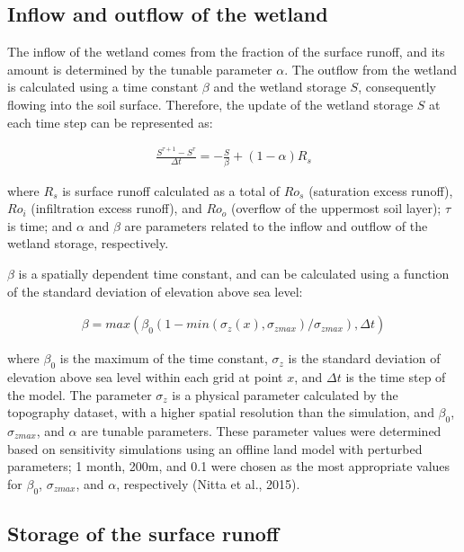 \hypertarget{inflow-and-outflow-of-the-wetland}{%
\subsection{Inflow and outflow of the wetland}\label{inflow-and-outflow-of-the-wetland}}

The inflow of the wetland comes from the fraction of the surface runoff, and its amount is determined by the tunable parameter \(\alpha\). The outflow from the wetland is calculated using a time
constant \(\beta\) and the wetland storage \(S\), consequently flowing into the soil surface. Therefore, the update of the wetland storage \(S\) at each time step can be represented as:

\begin{eqnarray}
\frac{S^{\tau +1}-S^{\tau }}{\Delta t}=-\frac{S}{\beta}+(1-\alpha )R_{s}
\end{eqnarray}

where \(R_{s}\) is surface runoff calculated as a total of \(Ro_{s}\) (saturation excess runoff), \(Ro_{i}\) (infiltration excess runoff), and \(Ro_{o}\) (overflow of the uppermost soil layer);
\(\tau\) is time; and \(\alpha\) and \(\beta\) are parameters related to the inflow and outflow of the wetland storage, respectively.

\(\beta\) is a spatially dependent time constant, and can be calculated using a function of the standard deviation of elevation above sea level:

\begin{eqnarray}
\beta =max(\beta_{0}(1-min(\sigma_{z}(x),\sigma_{z max})/\sigma_{z max}), \Delta t)
\end{eqnarray}

where \(\beta_{0}\) is the maximum of the time constant, \(\sigma _{z}\) is the standard deviation of elevation above sea level within each grid at point \(x\), and \(\Delta t\) is the time step of
the model. The parameter \(\sigma_{z}\) is a physical parameter calculated by the topography dataset, with a higher spatial resolution than the simulation, and \(\beta_{0}\), \(\sigma_{zmax}\), and
\(\alpha\) are tunable parameters. These parameter values were determined based on sensitivity simulations using an offline land model with perturbed parameters; 1 month, 200m, and 0.1 were chosen as
the most appropriate values for \(\beta_{0}\), \(\sigma _{zmax}\), and \(\alpha\), respectively (Nitta et al., 2015).

\hypertarget{storage-of-the-surface-runoff}{%
\subsection{Storage of the surface runoff}\label{storage-of-the-surface-runoff}}

